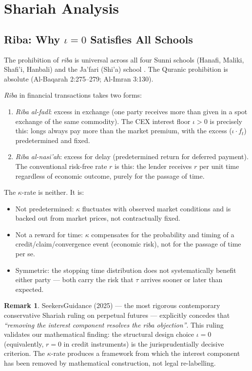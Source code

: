 \documentclass[10pt,twocolumn]{article}
\theoremstyle{plain}
\theoremstyle{definition}
\newtheorem{remark}{Remark}
\begin{document}
\section{Shariah Analysis}
\label{sec:shariah}

\subsection{Riba: Why $\iota = 0$ Satisfies All Schools}

The prohibition of \textit{riba} is universal across all four
Sunni schools (Hanafi, Maliki, Shafi'i, Hanbali) and the Ja'fari
(Shi'a) school \cite{Usmani2002,ElGamal2006}. The Quranic
prohibition is absolute (Al-Baqarah 2:275--279; Al-Imran 3:130).

\textit{Riba} in financial transactions takes two forms:
\begin{enumerate}[leftmargin=*,noitemsep]
\item \textit{Riba al-fadl}: excess in exchange (one party
receives more than given in a spot exchange of the same commodity).
The CEX interest floor $\iota > 0$ is precisely this: longs always
pay more than the market premium, with the excess ($\iota \cdot
f_t$) predetermined and fixed.
\item \textit{Riba al-nasi'ah}: excess for delay (predetermined
return for deferred payment). The conventional risk-free rate $r$
is this: the lender receives $r$ per unit time regardless of
economic outcome, purely for the passage of time.
\end{enumerate}

The $\kappa$-rate is neither. It is:
\begin{itemize}[leftmargin=*,noitemsep]
\item Not predetermined: $\kappa$ fluctuates with observed market
conditions and is backed out from market prices, not contractually
fixed.
\item Not a reward for time: $\kappa$ compensates for the
probability and timing of a credit/claim/convergence event
(economic risk), not for the passage of time per se.
\item Symmetric: the stopping time distribution does not
systematically benefit either party --- both carry the risk
that $\tau$ arrives sooner or later than expected.
\end{itemize}

\begin{remark}
SeekersGuidance (2025) --- the most rigorous contemporary
conservative Shariah ruling on perpetual futures --- explicitly
concedes that \textit{``removing the interest component resolves
the riba objection''}. This ruling validates our mathematical
finding: the structural design choice $\iota = 0$ (equivalently,
$r = 0$ in credit instruments) is the jurisprudentially decisive
criterion. The $\kappa$-rate produces a framework from which
the interest component has been removed by mathematical
construction, not legal re-labelling.
\end{remark}
\end{document}
